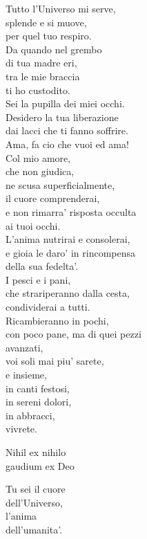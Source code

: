 \begin{haiku}
{Tutto l'Universo mi serve,\\
splende e si muove,\\
per quel tuo respiro.\\
Da quando nel grembo \\
di tua madre eri,\\
tra le mie braccia\\
ti ho custodito.\\
Sei la pupilla dei miei occhi.\\
Desidero la tua liberazione\\
dai lacci che ti fanno soffrire.\\
Ama, fa cio che vuoi ed ama!\\
Col mio amore,\\
che non giudica,\\
ne scusa superficialmente,\\
il cuore comprenderai,\\
e non rimarra' risposta occulta\\
ai tuoi occhi.\\
L'anima nutrirai e consolerai,\\
e gioia le daro' in rincompensa\\
della sua fedelta'.\\
I pesci e i pani,\\
che strariperanno dalla cesta,\\
condividerai a tutti.\\
Ricambieranno in pochi,\\
con poco pane, ma di quei pezzi\\
avanzati, \\
voi soli mai piu' sarete,\\
e insieme, \\
in canti festosi,\\
in sereni dolori,\\
in abbracci,\\
vivrete.\\
}
\end{haiku}



\begin{haiku}
	Nihil ex nihilo\\
	gaudium ex Deo\\
\end{haiku}

\begin{haiku}
	Tu sei il cuore \\
    dell'Universo,\\
	l'anima \\
    dell'umanita'.\\
\end{haiku}
